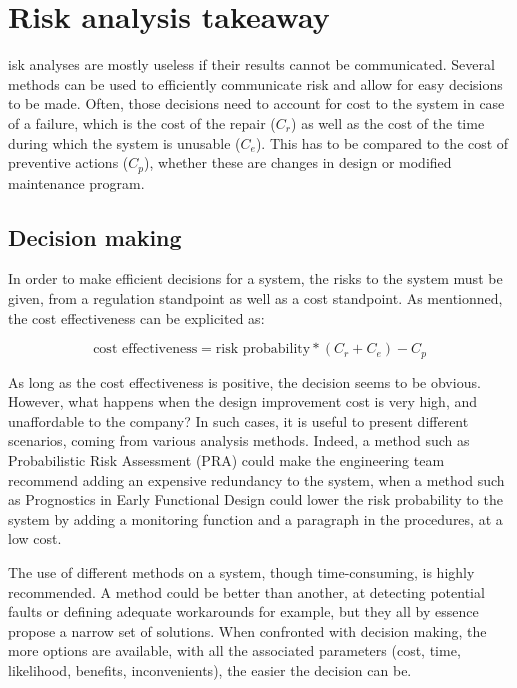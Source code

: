 %
%
\let\textcircled=\pgftextcircled
\chapter{Risk analysis takeaway}
\label{chap:dec}

isk analyses are mostly useless if their results cannot be communicated. Several methods can be used to efficiently communicate risk and allow for easy decisions to be made. Often, those decisions need to account for cost to the system in case of a failure, which is the cost of the repair ($C_r$) as well as the cost of the time during which the system is unusable ($C_e$). This has to be compared to the cost of preventive actions ($C_p$), whether these are changes in design or modified maintenance program.

\section{Decision making}

In order to make efficient decisions for a system, the risks to the system must be given, from a regulation standpoint as well as a cost standpoint. As mentionned, the cost effectiveness can be explicited as:

\begin{equation}
\text{cost effectiveness} = \text{risk probability} * (C_r + C_e) - C_p
\end{equation}

As long as the cost effectiveness is positive, the decision seems to be obvious. However, what happens when the design improvement cost is very high, and unaffordable to the company? In such cases, it is useful to present different scenarios, coming from various analysis methods. Indeed, a method such as Probabilistic Risk Assessment (PRA) could make the engineering team recommend adding an expensive redundancy to the system, when a method such as Prognostics in Early Functional Design could lower the risk probability to the system by adding a monitoring function and a paragraph in the procedures, at a low cost.

The use of different methods on a system, though time-consuming, is highly recommended. A method could be better than another, at detecting potential faults or defining adequate workarounds for example, but they all by essence propose a narrow set of solutions. When confronted with decision making, the more options are available, with all the associated parameters (cost, time, likelihood, benefits, inconvenients), the easier the decision can be.

